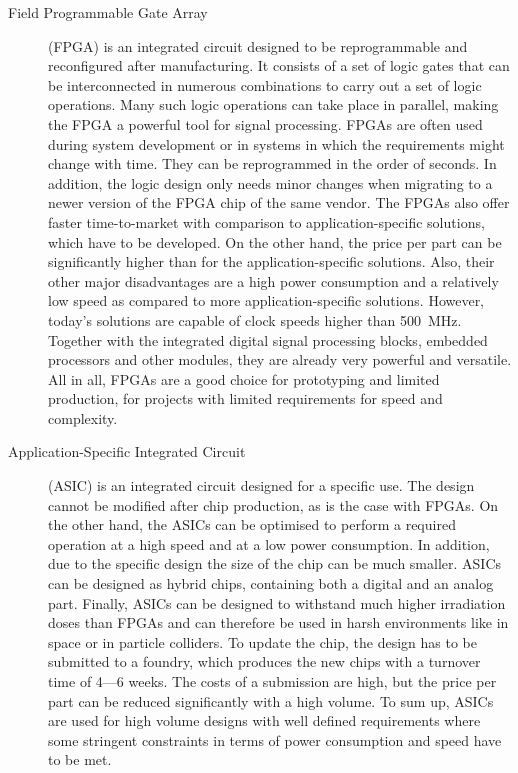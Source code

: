 \begin{description}
\item[Field Programmable Gate Array] (FPGA) is an integrated circuit designed to be reprogrammable and reconfigured after manufacturing. It consists of a set of logic gates that can be interconnected in numerous combinations to carry out a set of logic operations. Many such logic operations can take place in parallel, making the FPGA a powerful tool for signal processing. FPGAs are often used during system development or in systems in which the requirements might change with time. They can be reprogrammed in the order of seconds. In addition, the logic design only needs minor changes when migrating to a newer version of the FPGA chip of the same vendor. The FPGAs also offer faster time-to-market with comparison to application-specific solutions, which have to be developed. On the other hand, the price per part can be significantly higher than for the application-specific solutions. Also, their other major disadvantages are a high power consumption and a relatively low speed as compared to more application-specific solutions. However, today's solutions are capable of clock speeds higher than 500~MHz. Together with the integrated digital signal processing blocks, embedded processors and other modules, they are already very powerful and versatile. All in all, FPGAs are a good choice for prototyping and limited production, for projects with limited requirements for speed and complexity.

\item[Application-Specific Integrated Circuit] (ASIC) is an integrated circuit designed for a specific use. The design cannot be modified after chip production, as is the case with FPGAs. On the other hand, the ASICs can be optimised to perform a required operation at a high speed and at a low power consumption. In addition, due to the specific design the size of the chip can be much smaller. ASICs can be designed as hybrid chips, containing both a digital and an analog part. Finally, ASICs can be designed to withstand much higher irradiation doses than FPGAs and can therefore be used in harsh environments like in space or in particle colliders. To update the chip, the design has to be submitted to a foundry, which produces the new chips with a turnover time of 4---6 weeks. The costs of a submission are high, but the price per part can be reduced significantly with a high volume. To sum up, ASICs are used for high volume designs with well defined requirements where some stringent constraints in terms of power consumption and speed have to be met.
\end{description} 


